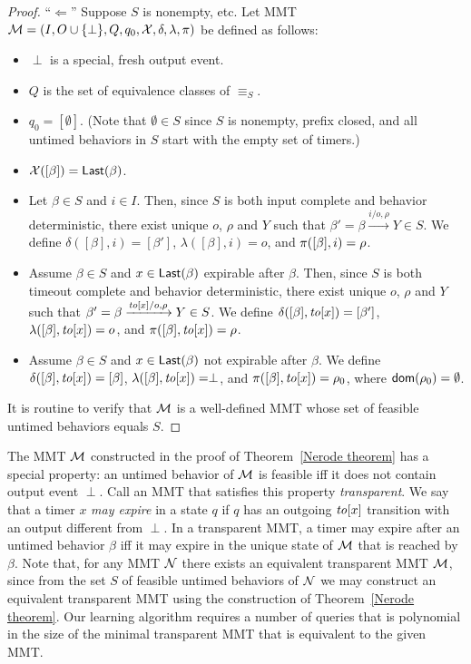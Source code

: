 \begin{proof}
``$\Leftarrow$'' Suppose $S$ is nonempty, etc.
Let MMT ${\cal M} = (I, O \cup \{ \perp \}, Q, q_0, \mathcal{X}, \delta, \lambda, \pi)$ be defined as follows:
\begin{itemize}
\item
$\perp$ is a special, fresh output event.
\item
$Q$ is the set of equivalence classes of $\equiv_S$.
\item
$q_0 = [\emptyset]$. (Note that $\emptyset \in S$ since $S$ is nonempty, prefix closed, and all untimed behaviors in $S$ start
with the empty set of timers.)
\item
$\mathcal{X}([\beta]) = \mathsf{Last}({\beta})$.
\item
Let $\beta \in S$ and $i \in I$. Then, since $S$ is both input complete and behavior deterministic, there exist unique
$o$, $\rho$ and $Y$ such that $\beta' = \beta \xrightarrow{i/o, \rho} Y \in S$.
We define $\delta([\beta],i) = [\beta']$, $\lambda([\beta],i) = o$, and $\pi([\beta],i) = \rho$.
\item
Assume $\beta \in S$ and $x\in \mathsf{Last}({\beta})$ expirable after $\beta$. 
Then, since $S$ is both timeout complete and behavior deterministic, there exist unique
$o$, $\rho$ and $Y$ such that $\beta' = \beta \xrightarrow{\mathit{to}[x]/o, \rho} Y \in S$.
We define $\delta([\beta],\mathit{to}[x]) = [\beta']$, $\lambda([\beta],\mathit{to}[x]) = o$, and $\pi([\beta],\mathit{to}[x]) = \rho$.
\item
Assume $\beta \in S$ and $x \in \mathsf{Last}({\beta})$ not expirable after $\beta$.
We define $\delta([\beta],\mathit{to}[x]) = [\beta]$, $\lambda([\beta],\mathit{to}[x]) = \perp$, and $\pi([\beta],\mathit{to}[x]) = \rho_0$, where ${\textsf{dom}}(\rho_0) = \emptyset$.
\end{itemize}
It is routine to verify that ${\cal M}$ is a well-defined MMT whose set of feasible untimed behaviors equals $S$.
\end{proof}

The MMT ${\cal M}$ constructed in the proof of Theorem~\ref{Nerode theorem} has a special property: an untimed
behavior of ${\cal M}$ is feasible iff it does not contain output event $\perp$. Call an MMT that satisfies this property
\emph{transparent}. 
We say that a timer $x$ \emph{may expire} in a state $q$ if $q$ has an outgoing $\mathit{to}[x]$ transition with
an output different from $\perp$.
In a transparent MMT, a timer may expire after an untimed behavior $\beta$ iff it may expire in the
unique state of ${\cal M}$ that is reached by $\beta$.
%
Note that, for any MMT ${\cal N}$ there exists an equivalent transparent MMT ${\cal M}$, since
from the set $S$ of feasible untimed behaviors of ${\cal N}$ we may construct an equivalent transparent MMT using the construction
of Theorem~\ref{Nerode theorem}.
Our learning algorithm requires a number of queries that is polynomial in the size of the minimal transparent MMT that is equivalent to the given MMT.

